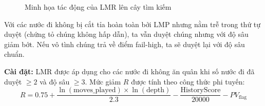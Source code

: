 \begin{figure}[H]
    \caption{Minh họa tác động của LMR lên cây tìm kiếm}
    \label{fig:lmr_profile}
\end{figure}

Với các nước đi không bị cắt tỉa hoàn toàn bởi LMP nhưng nằm trễ trong thứ tự duyệt (chứng tỏ chúng không hấp dẫn), ta vẫn duyệt chúng nhưng với độ sâu giảm bớt. Nếu vô tình chúng trả về điểm fail-high, ta sẽ duyệt lại với độ sâu chuẩn.

\textbf{Cài đặt:} LMR được áp dụng cho các nước đi không ăn quân khi số nước đi đã duyệt $\ge 2$ và độ sâu $\ge 3$. Mức giảm $R$ được tính theo công thức phi tuyến:
\[ R = 0.75 + \frac{\ln(\text{moves\_played}) \times \ln(\text{depth})}{2.3} - \frac{\text{HistoryScore}}{20000} - PV_{\text{flag}} \]

